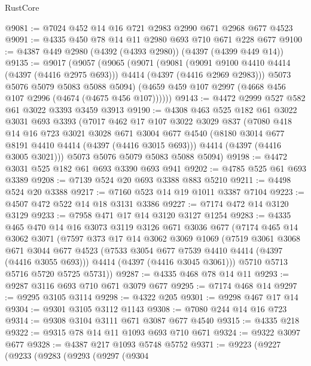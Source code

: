 \begin{lexlean}{RustCore}
\begin{coremodule}
@9081 := @7024 @452 @14 @16 @721 @2983 @2990 @671 @2968 @677 @4523
@9091 := @4335 @450 @78 @14 @11 @2980 @693 @710 @671 @228 @677
@9100 := @4387 @449 @2980 (@4392 (@4393 @2980)) (@4397 (@4399 @449 @14))
@9135 := @9017
    (@9057
      (@9065
        (@9071
          (@9081
            (@9091 @9100 @4410 @4414 (@4397 (@4416 @2975 @693)))
            @4414
            (@4397 (@4416 @2969 @2983)))
          @5073
          @5076
          @5079
          @5083
          @5088
          @5094)
        (@4659 @459 @107 @2997 (@4668 @456 @107 @2996 (@4674 (@4675 @456 @107))))))
@9143 := @4472 @2999 @527 @582 @61 @3022 @3393 @3459 @3913
@9190 := @4308
    @463
    @525
    @182
    @61
    @3022
    @3031
    @693
    @3393
    (@7017
      @462
      @17
      @107
      @3022
      @3029
      @837
      (@7080
        @418
        @14
        @16
        @723
        @3021
        @3028
        @671
        @3004
        @677
        @4540
        (@8180 @3014 @677 @8191 @4410 @4414 (@4397 (@4416 @3015 @693)))
        @4414
        (@4397 (@4416 @3005 @3021)))
      @5073
      @5076
      @5079
      @5083
      @5088
      @5094)
@9198 := @4472 @3031 @525 @182 @61 @693 @3390 @693 @941
@9202 := @4785 @525 @61 @693 @3389
@9208 := @7139 @524 @20 @693 @3388 @883 @5210
@9211 := @4498 @524 @20 @3388
@9217 := @7160 @523 @14 @19 @1011 @3387 @7104
@9223 := @4507 @472 @522 @14 @18 @3131 @3386
@9227 := @7174 @472 @14 @3120 @3129
@9233 := @7958 @471 @17 @14 @3120 @3127 @1254
@9283 := @4335
    @465
    @470
    @14
    @16
    @3073
    @3119
    @3126
    @671
    @3036
    @677
    (@7174
      @465
      @14
      @3062
      @3071
      (@7597
        @373
        @17
        @14
        @3062
        @3069
        @1069
        (@7519
          @3061
          @3068
          @671
          @3044
          @677
          @4523
          (@7533 @3054 @677 @7539 @4410 @4414 (@4397 (@4416 @3055 @693)))
          @4414
          (@4397 (@4416 @3045 @3061)))
        @5710
        @5713
        @5716
        @5720
        @5725
        @5731))
@9287 := @4335 @468 @78 @14 @11
@9293 := @9287 @3116 @693 @710 @671 @3079 @677
@9295 := @7174 @468 @14
@9297 := @9295 @3105 @3114
@9298 := @4322 @205
@9301 := @9298 @467 @17 @14
@9304 := @9301 @3105 @3112 @1143
@9308 := @7080 @244 @14 @16 @723
@9314 := @9308 @3104 @3111 @671 @3087 @677 @4540
@9315 := @4335 @218
@9322 := @9315 @78 @14 @11 @1093 @693 @710 @671
@9324 := @9322 @3097 @677
@9328 := @4387 @217 @1093 @5748 @5752
@9371 := @9223
    (@9227
      (@9233
        (@9283
          (@9293
            (@9297
              (@9304

\end{coremodule}
\end{lexlean}
